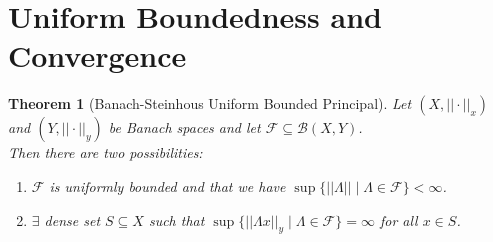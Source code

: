 \documentclass[11pt]{book}
\theoremstyle{break}
\theoremstyle{break}
\newtheorem{thm}{Theorem}[section]
\newcommand{\F}{\mathcal{F}}
\begin{document}
\newpage
\section[Uniform Boundedness and Convergence]{\color{red} Uniform Boundedness and Convergence\color{black}}
\begin{thm}[Banach-Steinhous Uniform Bounded Principal]
Let $(X,||\cdot ||_x)$ and $(Y, ||\cdot ||_y)$ be Banach spaces and let $\F \subseteq \mathcal{B}(X,Y)$. \\
Then there are two possibilities:
\begin{enumerate}[topsep=3pt,itemsep=-1ex,partopsep=1ex,parsep=1ex]
\item $\F$ is uniformly bounded and that we have $\sup\{ ||\Lambda || \mid \Lambda \in \F\} < \infty$. 
\item $\exists$ dense set $S \subseteq X$ such that $\sup\{ ||\Lambda x||_y \mid \Lambda \in \F\}= \infty$ for all $x \in S$. 
\end{enumerate} 
\end{thm}
\end{document}
